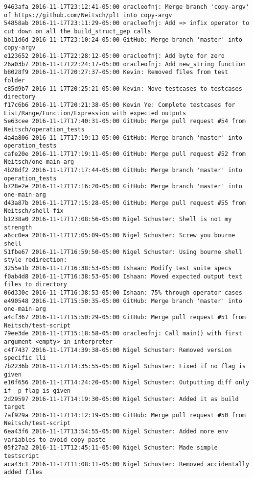 \begin{lstlisting}
9463afa 2016-11-17T23:12:41-05:00 oracleofnj: Merge branch 'copy-argv' of https://github.com/Neitsch/plt into copy-argv
54858ab 2016-11-17T23:11:29-05:00 oracleofnj: Add => infix operator to cut down on all the build_struct_gep calls
bb11d6d 2016-11-17T23:10:24-05:00 GitHub: Merge branch 'master' into copy-argv
e123652 2016-11-17T22:28:12-05:00 oracleofnj: Add byte for zero
26a03b7 2016-11-17T22:24:17-05:00 oracleofnj: Add new_string function
b8028f9 2016-11-17T20:27:37-05:00 Kevin: Removed files from test folder
c85d9b7 2016-11-17T20:25:21-05:00 Kevin: Move testcases to testcases directory
f17c6b6 2016-11-17T20:21:38-05:00 Kevin Ye: Complete testcases for List/Range/Function/Expression with expected outputs
5e63cee 2016-11-17T17:40:31-05:00 GitHub: Merge pull request #54 from Neitsch/operation_tests
4a4a806 2016-11-17T17:19:13-05:00 GitHub: Merge branch 'master' into operation_tests
cafe20e 2016-11-17T17:19:11-05:00 GitHub: Merge pull request #52 from Neitsch/one-main-arg
4b28df2 2016-11-17T17:17:44-05:00 GitHub: Merge branch 'master' into operation_tests
b728e2e 2016-11-17T17:16:20-05:00 GitHub: Merge branch 'master' into one-main-arg
d43a87b 2016-11-17T17:15:28-05:00 GitHub: Merge pull request #55 from Neitsch/shell-fix
b1238a0 2016-11-17T17:08:56-05:00 Nigel Schuster: Shell is not my strength
a6cc0ea 2016-11-17T17:05:09-05:00 Nigel Schuster: Screw you bourne shell
51fbe67 2016-11-17T16:59:50-05:00 Nigel Schuster: Using bourne shell style redirection:
3255e1b 2016-11-17T16:38:53-05:00 Ishaan: Modify test suite specs
f0ab4d8 2016-11-17T16:38:53-05:00 Ishaan: Moved expected output text files to directory
06d330c 2016-11-17T16:38:53-05:00 Ishaan: 75% through operator cases
e490548 2016-11-17T15:50:35-05:00 GitHub: Merge branch 'master' into one-main-arg
a4cf367 2016-11-17T15:50:29-05:00 GitHub: Merge pull request #51 from Neitsch/test-script
79ee3de 2016-11-17T15:18:58-05:00 oracleofnj: Call main() with first argument <empty> in interpreter
c4f7437 2016-11-17T14:39:38-05:00 Nigel Schuster: Removed version specific lli
7b2236b 2016-11-17T14:35:55-05:00 Nigel Schuster: Fixed if no flag is given
e10f656 2016-11-17T14:24:20-05:00 Nigel Schuster: Outputting diff only if -p flag is given
2d29597 2016-11-17T14:19:30-05:00 Nigel Schuster: Added it as build target
7af929a 2016-11-17T14:12:19-05:00 GitHub: Merge pull request #50 from Neitsch/test-script
6ea43f6 2016-11-17T13:54:55-05:00 Nigel Schuster: Added more env variables to avoid copy paste
05f27a2 2016-11-17T12:45:11-05:00 Nigel Schuster: Made simple testscript
aca43c1 2016-11-17T11:08:11-05:00 Nigel Schuster: Removed accidentally added files

\end{lstlisting}
